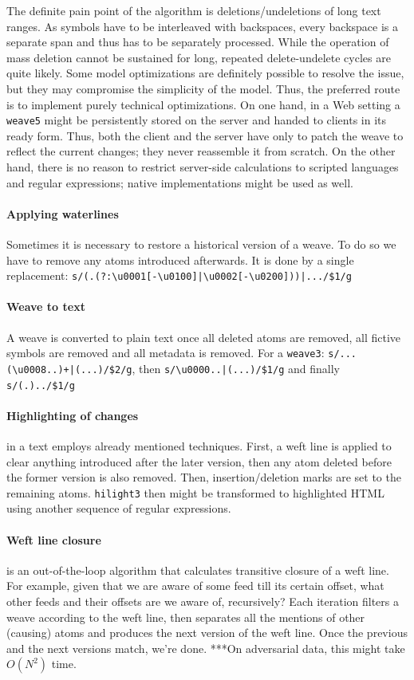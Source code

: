 \documentclass{acm_proc_article-sp}
\begin{document}
The definite pain point of the algorithm is deletions/undeletions of long text ranges. As symbols have to be interleaved with backspaces, every backspace is a separate span and thus has to be separately processed. While the operation of mass deletion cannot be sustained for long, repeated delete-undelete cycles are quite likely. Some model optimizations are definitely possible to resolve the issue, but they may compromise the simplicity of the model. Thus, the preferred route is to implement purely technical optimizations. On one hand, in a Web setting a {\tt weave5} might be persistently stored on the server and handed to clients in its ready form. Thus, both the client and the server have only to patch the weave to reflect the current changes; they never reassemble it from scratch. On the other hand, there is no reason to restrict server-side calculations to scripted languages and regular expressions; native implementations might be used as well.


\paragraph{Applying waterlines}
Sometimes it is necessary to restore a historical version of a weave. To do so we have to remove any atoms introduced afterwards. It is done by a single replacement:
\verb+s/(.(?:\u0001[-\u0100]|\u0002[-\u0200]))|.../$1/g+

\paragraph{Weave to text}

A weave is converted to plain text once all deleted atoms are removed, all fictive symbols are removed and all metadata is removed. For a {\tt weave3}: \verb!s/...(\u0008..)+|(...)/$2/g!, then \verb+s/\u0000..|(...)/$1/g+ and finally \verb+s/(.)../$1/g+

\paragraph{Highlighting of changes} in a text employs already mentioned techniques. First, a weft line is applied to clear anything introduced after the later version, then any atom deleted before the former version is also removed. Then, insertion/deletion marks are set to the remaining atoms. {\tt hilight3} then might be transformed to highlighted HTML using another sequence of regular expressions.

\paragraph{Weft line closure} is an out-of-the-loop algorithm that calculates transitive closure of a weft line. For example, given that we are aware of some feed till its certain offset, what other feeds and their offsets are we aware of, recursively? Each iteration filters a weave according to the weft line, then separates all the mentions of other (causing) atoms and produces the next version of the weft line. Once the previous and the next versions match, we're done. ***On adversarial data, this might take $O(N^{2})$ time.
\end{document}
